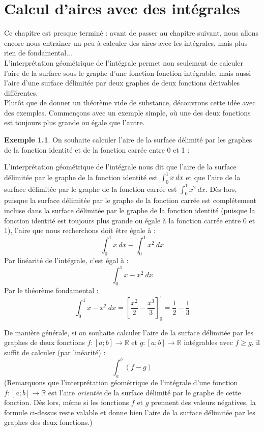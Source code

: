 \documentclass[a4paper,fontsize=13pt]{scrreprt}
\theoremstyle{plain}
\theoremstyle{definition}
\newtheorem{exe}[subsection]{Exemple}
\newcommand{\rr}{\mathbb{R}}
\newcommand {\grille}{\draw[help lines] (\xmin,\ymin) grid (\xmax,\ymax);}
\newcommand {\axes} {
	\draw[thick, ->] (\xmin,0) -- (\xmax+1,0);
	\draw[thick, ->] (0,\ymin) -- (0,\ymax+1);
	\draw (0,\ymax+0.5) node [left] {$y$};
	\draw (\xmax+0.5, 0) node [below] {$x$};
	\draw[thick] (-0.15,1)--(0.15,1) (1,-0.15)--(1,0.15);
	\draw (0,1)node[left]{$1$} (1,0)node[below]{$1$};
}
\begin{document}
\chapter{Calcul d'aires avec des intégrales}

Ce chapitre est presque terminé : avant de passer au chapitre suivant, nous allons encore nous entrainer un peu à calculer des aires avec les intégrales, mais plus rien de fondamental... \\
L'interprétation géométrique de l'intégrale permet non seulement de calculer l'aire de la surface sous le graphe d'une fonction fonction intégrable, mais aussi l'aire d'une surface délimitée par deux graphes de deux fonctions dérivables différentes. \\
Plutôt que de donner un théorème vide de substance, découvrons cette idée avec des exemples. Commençons avec un exemple simple, où une des deux fonctions est toujours plus grande ou égale que l'autre.
\begin{exe}
On souhaite calculer l'aire de la surface délimité par les graphes de la fonction identité et de la fonction carrée entre 0 et 1 :
\begin{center}
\end{center}
L'interprétation géométrique de l'intégrale nous dit que l'aire de la surface délimitée par le graphe de la fonction identité est $\int_0^1 x~dx$ et que l'aire de la surface délimitée par le graphe de la fonction carrée est $\int_0^1 x^2~dx$. Dès lors, puisque la surface délimitée par le graphe de la fonction carrée est complétement incluse dans la surface délimitée par le graphe de la fonction identité (puisque la fonction identité est toujours plus grande ou égale à la fonction carrée entre 0 et 1), l'aire que nous recherchons doit être égale à :
$$\int_0^1 x~dx - \int_0^1 x^2~dx$$
Par linéarité de l'intégrale, c'est égal à :
$$\int_0^1 x-x^2~dx$$
Par le théorème fondamental :
$$\int_0^1 x-x^2~dx = [\frac{x^2}{2} - \frac{x^3}{3}]_0^1 = \frac{1}{2}-\frac{1}{3}$$
\end{exe}
De manière générale, si on souhaite calculer l'aire de la surface délimitée par les graphes de deux fonctions $f : [a;b] \to \rr$ et $g : [a;b] \to  \rr$ intégrables avec $f \ge g$, il suffit de calculer (par linéarité) :
$$\int_a^b (f-g)$$
(Remarquons que l'interprétation géométrique de l'intégrale d'une fonction $f : [a;b] \to \rr$ est l'aire \emph{orientée} de la surface délimité par le graphe de cette fonction. Dès lors, même si les fonctions $f$ et $g$ prennent des valeurs négatives, la formule ci-dessus reste valable et donne bien l'aire de la surface délimitée par les graphes des deux fonctions.) \\
\end{document}

